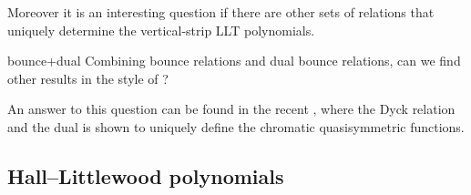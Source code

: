 \documentclass[reqno]{amsart}
\begin{document}
Moreover it is an interesting question if there are other sets of relations that uniquely determine the vertical-strip LLT polynomials.

\begin{prob}{bounce+dual}
Combining bounce relations and dual bounce relations,
can we find other results in the style of ?
\end{prob}
An answer to this question can be found in the recent \cite{AbreuNigro2020ax},
where the Dyck relation and the dual is shown to uniquely define the 
chromatic quasisymmetric functions.



\subsection{Hall--Littlewood polynomials}
\end{document}
